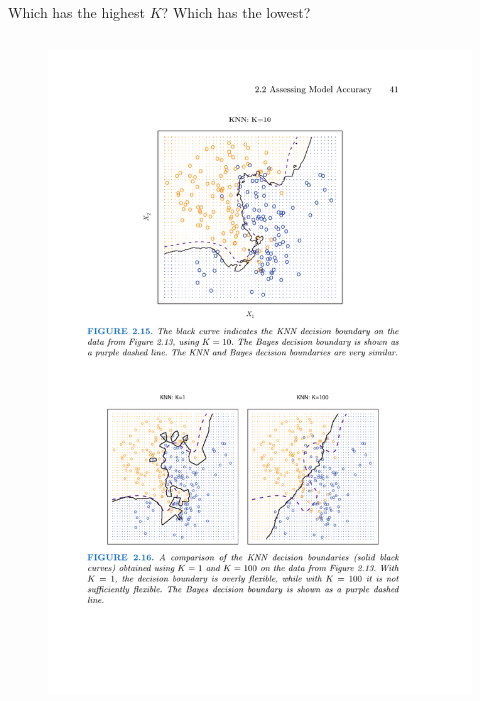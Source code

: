 \documentclass[aspectratio=169]{beamer}
\begin{document}
\begin{frame}{Which has the highest $K$?  Which has the lowest?}
\begin{columns}
\begin{figure}
\includegraphics[width=\textwidth]{KNN_k1}
\caption*{}
\end{figure}
\end{columns}
\end{frame}
\end{document}
